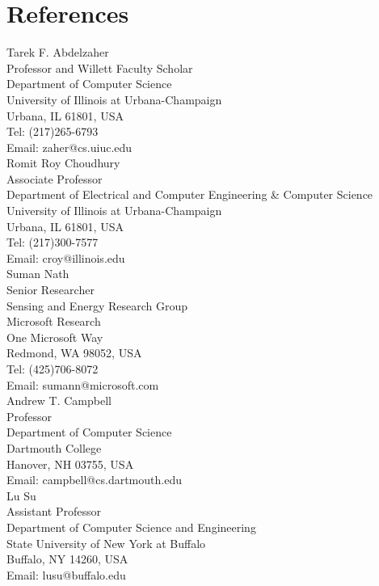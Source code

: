 \section{\sc References}
Tarek F. Abdelzaher\\
Professor and Willett Faculty Scholar\\
Department of Computer Science\\
University of Illinois at Urbana-Champaign\\
Urbana, IL 61801, USA\\
Tel: (217)265-6793\\
Email: zaher@cs.uiuc.edu\\

Romit Roy Choudhury\\
Associate Professor\\
Department of Electrical and Computer Engineering \& Computer Science\\
University of Illinois at Urbana-Champaign\\
Urbana, IL 61801, USA\\
Tel: (217)300-7577\\
Email: croy@illinois.edu\\

Suman Nath\\
Senior Researcher\\
Sensing and Energy Research Group\\
Microsoft Research\\
One Microsoft Way\\
Redmond, WA 98052, USA\\
Tel: (425)706-8072\\
Email: sumann@microsoft.com\\

Andrew T. Campbell\\
Professor\\
Department of Computer Science\\
Dartmouth College\\
Hanover, NH 03755, USA\\
Email: campbell@cs.dartmouth.edu\\

Lu Su\\
Assistant Professor\\
Department of Computer Science and Engineering\\
State University of New York at Buffalo\\
Buffalo, NY 14260, USA\\
Email: lusu@buffalo.edu\\